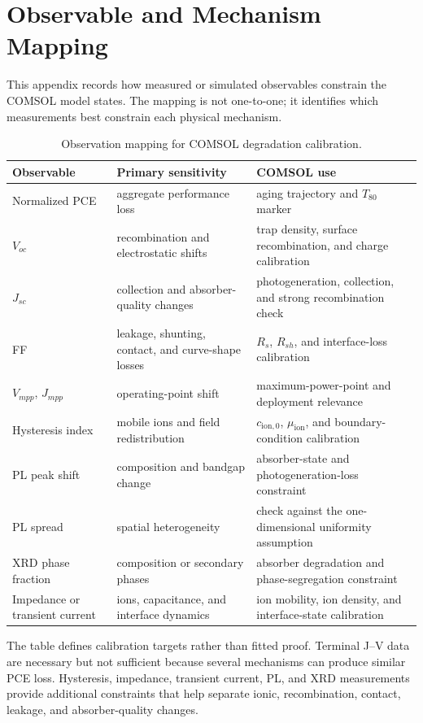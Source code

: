 \chapter{Observable and Mechanism Mapping}

This appendix records how measured or simulated observables constrain the
COMSOL model states. The mapping is not one-to-one; it identifies which
measurements best constrain each physical mechanism.

\begin{table}[H]
\centering
\begin{tabular}{p{}p{}p{}}
\toprule
Observable & Primary sensitivity & COMSOL use \\
\midrule
Normalized PCE & aggregate performance loss & aging trajectory and $T_{80}$ marker \\
$V_{oc}$ & recombination and electrostatic shifts & trap density, surface recombination, and charge calibration \\
$J_{sc}$ & collection and absorber-quality changes & photogeneration, collection, and strong recombination check \\
FF & leakage, shunting, contact, and curve-shape losses & $R_s$, $R_{sh}$, and interface-loss calibration \\
$V_{mpp}$, $J_{mpp}$ & operating-point shift & maximum-power-point and deployment relevance \\
Hysteresis index & mobile ions and field redistribution & $c_{\mathrm{ion},0}$, $\mu_{\mathrm{ion}}$, and boundary-condition calibration \\
PL peak shift & composition and bandgap change & absorber-state and photogeneration-loss constraint \\
PL spread & spatial heterogeneity & check against the one-dimensional uniformity assumption \\
XRD phase fraction & composition or secondary phases & absorber degradation and phase-segregation constraint \\
Impedance or transient current & ions, capacitance, and interface dynamics & ion mobility, ion density, and interface-state calibration \\
\bottomrule
\end{tabular}
\caption{Observation mapping for COMSOL degradation calibration.}
\label{tab:feature_state_mapping}
\end{table}

The table defines calibration targets rather than fitted proof. Terminal J--V
data are necessary but not sufficient because several mechanisms can produce
similar PCE loss. Hysteresis, impedance, transient current, PL, and XRD
measurements provide additional constraints that help separate ionic,
recombination, contact, leakage, and absorber-quality changes.
